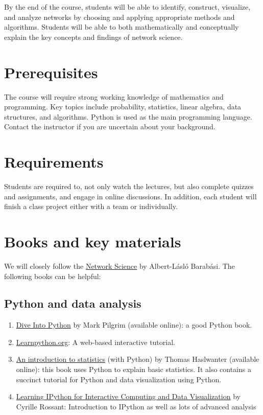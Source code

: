 \documentclass[11pt,article,oneside]{memoir}
\begin{document}
By the end of the course, students will be able to identify, construct,
visualize, and analyze networks by choosing and applying appropriate methods
and algorithms. Students will be able to both mathematically and conceptually
explain the key concepts and findings of network science. 

\section{Prerequisites}
\label{sec:Prerequisites}

The course will require strong working knowledge of mathematics and
programming. Key topics include probability, statistics, linear algebra, data
structures, and algorithms. Python is used as the main programming language.
Contact the instructor if you are uncertain about your background. 

\section{Requirements}
\label{sec:requirements}

Students are required to, not only watch the lectures, but also complete
quizzes and assignments, and engage in online discussions. In addition, each
student will finish a class project either with a team or individually. 

\section{Books and key materials}

We will closely follow the
\href{http://barabasi.com/networksciencebook/}{Network Science} by Albert-Lásló
Barabási. The following books can be helpful:

\subsection{Python and data analysis}

\begin{enumerate}

\item \href{http://www.diveintopython3.net/index.html}{Dive Into Python} by Mark Pilgrim (available online): a good Python book. 

\item \href{http://www.learnpython.org}{Learnpython.org}: A web-based interactive tutorial. 

\item \href{http://work.thaslwanter.at/Stats/html/}{An introduction to statistics} (with Python) by Thomas Haslwanter (available online): this book uses Python to explain basic statistics. It also contains a succinct tutorial for Python and data visualization using Python. 

\item \href{http://ipython.rossant.net}{Learning IPython for Interactive Computing and Data Visualization} by  Cyrille Rossant: Introduction to IPython as well as lots of advanced analysis 


\end{enumerate}
\end{document}

